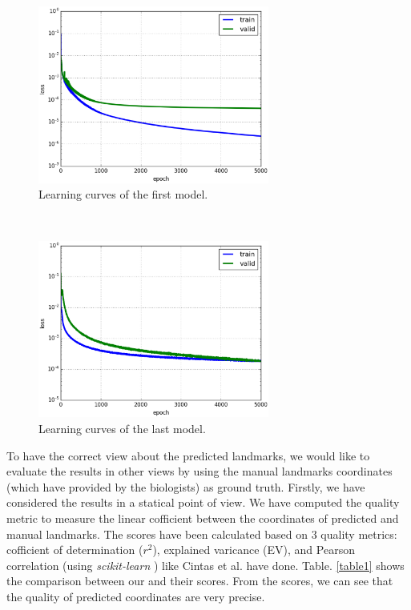 \documentclass{article} %
\begin{document}
\begin{multicols}{2}
\begin{figure}[H]
	\centerline{\includegraphics[height=2.3in]{images/loss_model_1.eps}}
	\caption{\footnotesize{Learning curves of the first model.}}
	\label{figloss1}
\end{figure}~\\
\begin{figure}[H]
	\centerline{\includegraphics[height=2.3in]{images/loss_v16.eps}}
	\caption{\footnotesize{Learning curves of the last model.}}
	\label{figloss}
\end{figure}

To have the correct view about the predicted landmarks, we would like to evaluate the results in other views by using the manual landmarks coordinates (which have provided by the biologists) as ground truth. Firstly, we have considered the results in a statical point of view. We have computed the quality metric to measure the linear cofficient between the coordinates of predicted and manual landmarks. The scores have been calculated based on $3$ quality metrics: cofficient of determination ($r^2$), explained varicance (EV), and Pearson correlation (using \textit{scikit-learn} \cite{pedregosa2011scikit}) like Cintas et al. \cite{cintas2016automatic} have done. Table. \ref{table1} shows the comparison between our and their scores. From the scores, we can see that the quality of predicted coordinates are very precise.


\end{multicols}
\end{document}
